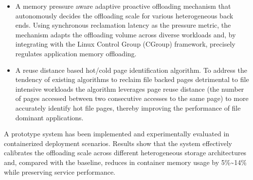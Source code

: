 \begin{englishabstract}
\begin{itemize}
\item A memory pressure aware adaptive proactive offloading mechanism that \\autonomously decides the offloading scale for various heterogeneous back ends. Using synchronous reclamation latency as the pressure metric, the mechanism adapts the offloading volume across diverse workloads and, by integrating with the Linux Control Group (CGroup) framework, precisely regulates application memory offloading.
\item A reuse distance based hot/cold page identification algorithm. To address the tendency of existing algorithms to reclaim file backed pages detrimental to file intensive workloads the algorithm leverages page reuse distance (the number of pages accessed between two consecutive accesses to the same page) to more accurately identify hot file pages, thereby improving the performance of file dominant applications.
\end{itemize}

A prototype system has been implemented and experimentally evaluated in containerized deployment scenarios. Results show that the system effectively calibrates the offloading scale across different heterogeneous storage architectures and, compared with the baseline, reduces in container memory usage by 5\%\textasciitilde{}14\% while preserving service performance.



\end{englishabstract}


